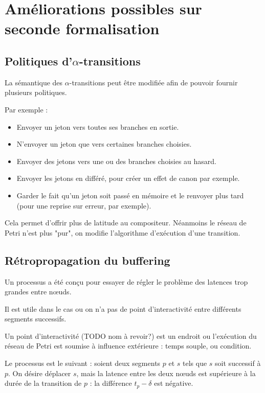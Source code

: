 \section{Améliorations possibles sur seconde formalisation}
\subsection{Politiques d'$\alpha$-transitions}
\label{section:canon}
La sémantique des $\alpha$-transitions peut être modifiée afin de pouvoir fournir plusieurs politiques.

Par exemple : 
\begin{itemize}
\item Envoyer un jeton vers toutes ses branches en sortie.
\item N'envoyer un jeton que vers certaines branches choisies.
\item Envoyer des jetons vers une ou des branches choisies au hasard.
\item Envoyer les jetons en différé, pour créer un effet de canon par exemple.
\item Garder le fait qu'un jeton soit passé en mémoire et le renvoyer plus tard (pour une reprise sur erreur, par exemple).
\end{itemize}

Cela permet d'offrir plus de latitude au compositeur. Néanmoins le réseau de Petri n'est plus "pur", on modifie l'algorithme d'exécution d'une transition.


\subsection{Rétropropagation du buffering}
\label{section:retropropag}
Un processus a été conçu pour essayer de régler le problème des latences trop grandes entre nœuds.

Il est utile dans le cas ou on n'a pas de point d'interactivité entre différents segments successifs.

\begin{mydef}Un point d'interactivité (TODO nom à revoir?) est un endroit ou l'exécution du réseau de Petri est soumise à influence extérieure : temps souple, ou condition.
\end{mydef}

Le processus est le suivant : soient deux segments $p$ et $s$ tels que $s$ soit successif à $p$. On désire déplacer $s$, mais la latence entre les deux nœuds est supérieure à la durée de la transition de $p$ : la différence $t_p - \delta$ est négative.


